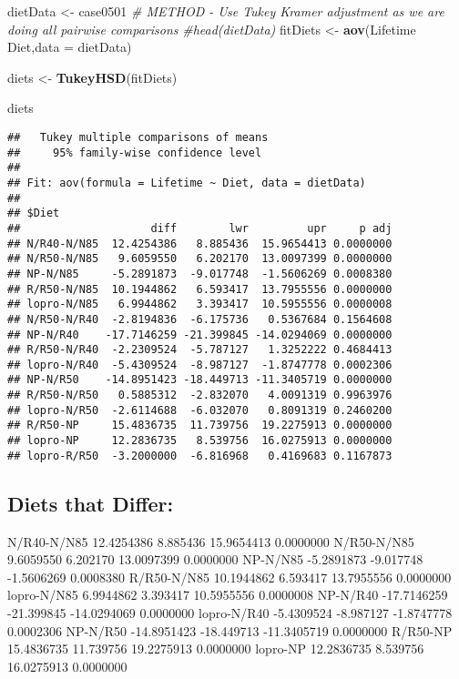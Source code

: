 \documentclass[
]{article}
\newenvironment{Shaded}{\begin{snugshade}}{\end{snugshade}}
\newcommand{\CommentTok}[1]{\textcolor[rgb]{0.56,0.35,0.01}{\textit{#1}}}
\newcommand{\DataTypeTok}[1]{\textcolor[rgb]{0.13,0.29,0.53}{#1}}
\newcommand{\KeywordTok}[1]{\textcolor[rgb]{0.13,0.29,0.53}{\textbf{#1}}}
\newcommand{\NormalTok}[1]{#1}
\newcommand{\OperatorTok}[1]{\textcolor[rgb]{0.81,0.36,0.00}{\textbf{#1}}}
\newcommand{\StringTok}[1]{\textcolor[rgb]{0.31,0.60,0.02}{#1}}
\begin{document}
\begin{Shaded}
\begin{Highlighting}[]
\NormalTok{dietData <-}\StringTok{ }\NormalTok{case0501}
\CommentTok{# METHOD - Use Tukey Kramer adjustment as we are doing all pairwise comparisons}
\CommentTok{#head(dietData)}
\NormalTok{fitDiets <-}\StringTok{ }\KeywordTok{aov}\NormalTok{(Lifetime }\OperatorTok{~}\StringTok{ }\NormalTok{Diet,}\DataTypeTok{data =}\NormalTok{ dietData)}

\NormalTok{diets <-}\StringTok{ }\KeywordTok{TukeyHSD}\NormalTok{(fitDiets)}

\NormalTok{diets}
\end{Highlighting}
\end{Shaded}

\begin{verbatim}
##   Tukey multiple comparisons of means
##     95% family-wise confidence level
## 
## Fit: aov(formula = Lifetime ~ Diet, data = dietData)
## 
## $Diet
##                    diff        lwr         upr     p adj
## N/R40-N/N85  12.4254386   8.885436  15.9654413 0.0000000
## N/R50-N/N85   9.6059550   6.202170  13.0097399 0.0000000
## NP-N/N85     -5.2891873  -9.017748  -1.5606269 0.0008380
## R/R50-N/N85  10.1944862   6.593417  13.7955556 0.0000000
## lopro-N/N85   6.9944862   3.393417  10.5955556 0.0000008
## N/R50-N/R40  -2.8194836  -6.175736   0.5367684 0.1564608
## NP-N/R40    -17.7146259 -21.399845 -14.0294069 0.0000000
## R/R50-N/R40  -2.2309524  -5.787127   1.3252222 0.4684413
## lopro-N/R40  -5.4309524  -8.987127  -1.8747778 0.0002306
## NP-N/R50    -14.8951423 -18.449713 -11.3405719 0.0000000
## R/R50-N/R50   0.5885312  -2.832070   4.0091319 0.9963976
## lopro-N/R50  -2.6114688  -6.032070   0.8091319 0.2460200
## R/R50-NP     15.4836735  11.739756  19.2275913 0.0000000
## lopro-NP     12.2836735   8.539756  16.0275913 0.0000000
## lopro-R/R50  -3.2000000  -6.816968   0.4169683 0.1167873
\end{verbatim}

\hypertarget{diets-that-differ}{%
\subsection{Diets that Differ:}\label{diets-that-differ}}

N/R40-N/N85 12.4254386 8.885436 15.9654413 0.0000000 N/R50-N/N85
9.6059550 6.202170 13.0097399 0.0000000 NP-N/N85 -5.2891873 -9.017748
-1.5606269 0.0008380 R/R50-N/N85 10.1944862 6.593417 13.7955556
0.0000000 lopro-N/N85 6.9944862 3.393417 10.5955556 0.0000008 NP-N/R40
-17.7146259 -21.399845 -14.0294069 0.0000000 lopro-N/R40 -5.4309524
-8.987127 -1.8747778 0.0002306 NP-N/R50 -14.8951423 -18.449713
-11.3405719 0.0000000 R/R50-NP 15.4836735 11.739756 19.2275913 0.0000000
lopro-NP 12.2836735 8.539756 16.0275913 0.0000000
\end{document}
